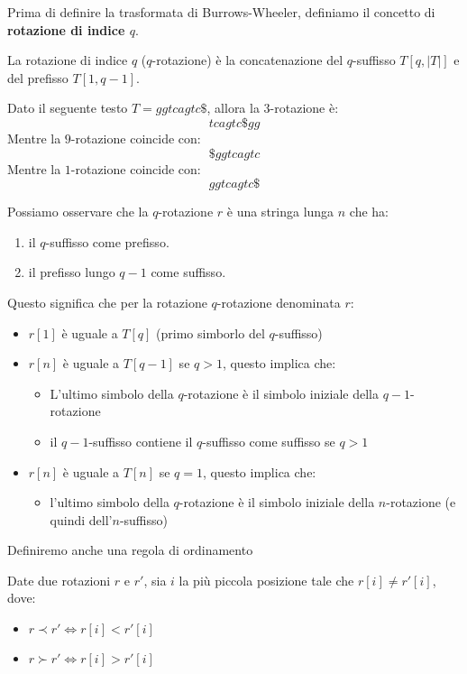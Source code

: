 Prima di definire la trasformata di Burrows-Wheeler, definiamo il concetto di
\textbf{rotazione di indice $q$}.
\begin{definizione}
    La rotazione di indice $q$ ($q$-rotazione) è la concatenazione
    del $q$-suffisso $T[q,|T|]$ e del prefisso $T[1,q-1]$.
\end{definizione}
\begin{esempio}
    Dato il seguente testo $T=ggtcagtc\$$, allora la $3$-rotazione è:
    $$tcagtc\$gg$$
    Mentre la $9$-rotazione coincide con:
    $$\$ggtcagtc$$
    Mentre la $1$-rotazione coincide con:
    $$ggtcagtc\$$$
\end{esempio}
Possiamo osservare che la $q$-rotazione $r$ è una stringa lunga $n$ che ha:
\begin{enumerate}
    \item il $q$-suffisso come prefisso.
    \item il prefisso lungo $q-1$ come suffisso.
\end{enumerate}
Questo significa che per la rotazione $q$-rotazione denominata $r$:
\begin{itemize}
    \item $r[1]$ è uguale a $T[q]$ (primo simborlo del $q$-suffisso)
    \item $r[n]$ è uguale a $T[q-1]$ se $q>1$, questo implica che:
          \begin{itemize}
              \item L'ultimo simbolo della $q$-rotazione è il simbolo iniziale
                    della $q-1$-rotazione
              \item il $q-1$-suffisso contiene il $q$-suffisso come suffisso se
                    $q>1$
          \end{itemize}
    \item $r[n]$ è uguale a $T[n]$ se $q=1$, questo implica che:
          \begin{itemize}
              \item l'ultimo simbolo della $q$-rotazione è il simbolo iniziale
                    della $n$-rotazione (e quindi dell'$n$-suffisso)
          \end{itemize}
\end{itemize}
Definiremo anche una regola di ordinamento
\begin{definizione}
    Date due rotazioni $r$ e $r'$, sia $i$ la più piccola posizione tale che
    $r[i]\ne r'[i]$, dove:
    \begin{itemize}
        \item $r \prec r'\iff r[i] < r'[i]$
        \item $r \succ r'\iff r[i] > r'[i]$
    \end{itemize}
\end{definizione}
